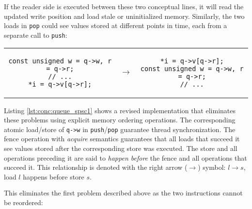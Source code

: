 If the reader side is executed between these two conceptual lines, it will read
the updated write position and load stale or uninitialized memory.  Similarly,
the two loads in \texttt{pop} could see values stored at different points in
time, each from a separate call to \texttt{push}:

\begin{center}
    \begin{tabular}{ccc}
        \begin{lstlisting}[style=c]
const unsigned w = q->w, r = q->r;
// ...
*i = q->v[q->r];
        \end{lstlisting}
        & $\to$ &
        \begin{lstlisting}[style=c]
*i = q->v[q->r];
const unsigned w = q->w, r = q->r;
// ...
        \end{lstlisting} \\[1.5em]
    \end{tabular}
\end{center}

Listing \ref{lst:conc:queue_spsc1} shows a revised implementation that
eliminates these problems using explicit memory ordering operations.  The
corresponding atomic load/store of \texttt{q->w} in \texttt{push}/\texttt{pop}
guarantee thread synchronization.  The fence operation with \emph{acquire}
semantics guarantees that all loads that succeed it see values stored after the
corresponding store was executed\footnotemark.  The store and all operations
preceding it are said to \textit{happen before} the fence and all operations
that succeed it.  This relationship is denoted with the right arrow ($\to$)
symbol: $l \to s$, load $l$ happens before store $s$.


This eliminates the first problem described above as the two instructions cannot
be reordered\footnotemark:


